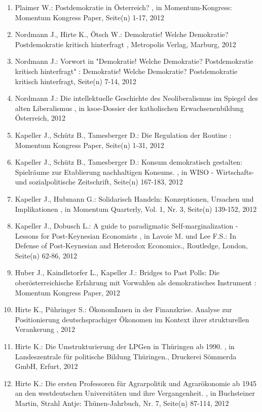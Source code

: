 \begin{enumerate}[leftmargin=*, labelsep=0.5cm]
	 \item Plaimer W.:  Postdemokratie in Österreich?  , in Momentum-Kongress: Momentum Kongress Paper, Seite(n) 1-17, 2012
	 \item Nordmann J., Hirte K., Ötsch W.:  Demokratie! Welche Demokratie? Postdemokratie kritisch hinterfragt  , Metropolis Verlag, Marburg, 2012
	 \item Nordmann J.:  Vorwort in "Demokratie! Welche Demokratie? Postdemokratie kritisch hinterfragt"  : Demokratie! Welche Demokratie? Postdemokratie kritisch hinterfragt, Seite(n) 7-14, 2012
	 \item Nordmann J.:  Die intellektuelle Geschichte des Neoliberalismus im Spiegel des alten Liberalismus  , in ksoe-Dossier der katholischen Erwachsenenbildung Österreich, 2012
	 \item Kapeller J., Schütz B., Tamesberger D.:  Die Regulation der Routine  : Momentum Kongress Paper, Seite(n) 1-31, 2012
	 \item Kapeller J., Schütz B., Tamesberger D.:  Konsum demokratisch gestalten: Spielräume zur Etablierung nachhaltigen Konsums.  , in WISO - Wirtschafts- und sozialpolitische Zeitschrift, Seite(n) 167-183, 2012
	 \item Kapeller J., Hubmann G.:  Solidarisch Handeln: Konzeptionen, Ursachen und Implikationen  , in Momentum Quarterly, Vol. 1, Nr. 3, Seite(n) 139-152, 2012
	 \item Kapeller J., Dobusch L.:  A guide to paradigmatic Self-marginalization - Lessons for Post-Keynesian Economists  , in Lavoie M. und Lee F.S.: In Defense of Post-Keynesian and Heterodox Economics., Routledge, London, Seite(n) 62-86, 2012
	 \item Huber J., Kaindlstorfer L., Kapeller J.:  Bridges to Past Polls: Die oberösterreichische Erfahrung mit Vorwahlen als demokratisches Instrument  : Momentum Kongress Paper, 2012
	 \item Hirte K., Pühringer S.:  ÖkonomInnen in der Finanzkrise. Analyse zur Positionierung deutschsprachiger Ökonomen im Kontext ihrer strukturellen Verankerung  , 2012
	 \item Hirte K.:  Die Umstrukturierung der LPGen in Thüringen ab 1990.  , in Landeszentrale für politische Bildung Thüringen., Druckerei Sömmerda GmbH, Erfurt, 2012
	 \item Hirte K.:  Die ersten Professoren für Agrarpolitik und Agrarökonomie ab 1945 an den westdeutschen Universitäten und ihre Vergangenheit.  , in Buchsteiner Martin, Strahl Antje: Thünen-Jahrbuch, Nr. 7, Seite(n) 87-114, 2012

\end{enumerate}
